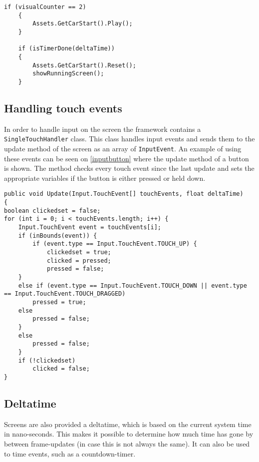 \begin{lstlisting}[caption=Playing a sound, label=playsound]
	if (visualCounter == 2) 
	{
		Assets.GetCarStart().Play();
	}

	if (isTimerDone(deltaTime)) 
	{
		Assets.GetCarStart().Reset();
		showRunningScreen();
	}
\end{lstlisting}

\subsection{Handling touch events}
In order to handle input on the screen the framework contains a \lstinline|SingleTouchHandler| class.
This class handles input events and sends them to the update method of the screen as an array of \lstinline|InputEvent|.
An example of using these events can be seen on \cref{inputbutton} where the update method of a button is shown. 
The method checks every touch event since the last update and sets the appropriate variables if the button is either pressed or held down.

\begin{lstlisting}[caption=Implementation of an ingame button, label=inputbutton]
public void Update(Input.TouchEvent[] touchEvents, float deltaTime) 
{
boolean clickedset = false;
for (int i = 0; i < touchEvents.length; i++) {
	Input.TouchEvent event = touchEvents[i];
	if (inBounds(event)) {
		if (event.type == Input.TouchEvent.TOUCH_UP) {
			clickedset = true;
			clicked = pressed;
			pressed = false;
	}
	else if (event.type == Input.TouchEvent.TOUCH_DOWN || event.type == Input.TouchEvent.TOUCH_DRAGGED)
		pressed = true;
	else
		pressed = false;
	} 
	else
		pressed = false;
	}
	if (!clickedset)
		clicked = false;
}
\end{lstlisting}

\subsection{Deltatime}
Screens are also provided a deltatime, which is based on the current system time in nano-seconds.
This makes it possible to determine how much time has gone by between frame-updates (in case this is not always the same).
It can also be used to time events, such as a countdown-timer.